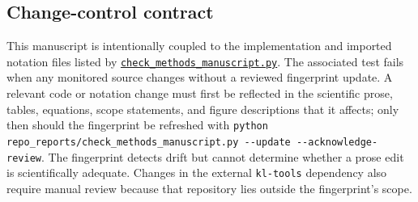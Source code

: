 \documentclass[11pt]{article}
\newcommand{\code}[1]{\nolinkurl{#1}}
\begin{document}
\subsection{Change-control contract}

This manuscript is intentionally coupled to the implementation and imported
notation files listed by
\href{check_methods_manuscript.py}{\code{check_methods_manuscript.py}}. The associated
test fails when any monitored source changes without a reviewed fingerprint
update. A relevant code or notation change must first be reflected in the
scientific prose, tables, equations, scope statements, and figure descriptions
that it affects; only then should the fingerprint be refreshed with
\code{python repo_reports/check_methods_manuscript.py --update --acknowledge-review}.
The fingerprint detects drift but cannot determine whether a prose edit is
scientifically adequate. Changes in the external \code{kl-tools} dependency also
require manual review because that repository lies outside the fingerprint's
scope.
\end{document}
